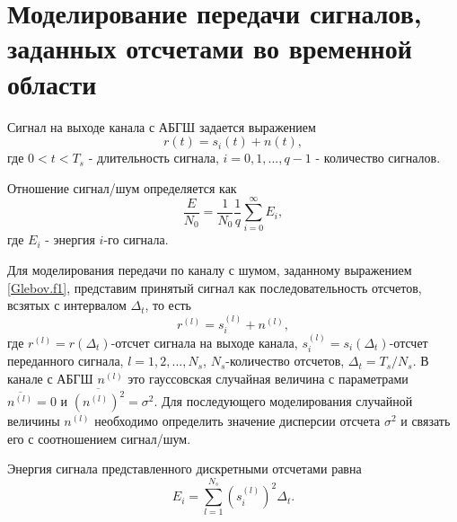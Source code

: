 \section{Моделирование передачи сигналов, заданных отсчетами во временной области}
\label{sec:model}
	Сигнал на выходе канала с АБГШ задается выражением
	\begin{equation}
	\label{Glebov.f1}
		r(t)=s_i(t)+n(t),
	\end{equation}
	где $0<t<T_s$ - длительность сигнала, $i=0,1,...,q-1$ - количество сигналов.

	Отношение сигнал/шум определяется как
	\begin{equation}
	\label{Glebov.f2}
		\frac{E}{N_0}=\frac{1}{N_0}\frac{1}{q}\sum_{i=0}^{\infty}E_i,
	\end{equation}
	где $E_i$ - энергия $i$-го сигнала.
	
	Для моделирования передачи по каналу с шумом, заданному выражением
	\ref{Glebov.f1}, представим принятый сигнал как последовательность отсчетов, всзятых с интервалом $\Delta_t$, то есть
	\begin{equation}
	\label{Glebov.f3}
		r^{(l)}=s_i^{(l)}+n^{(l)},
	\end{equation}
	где $r^{(l)}=r(\Delta_t)$-отсчет сигнала на выходе канала, $s_i^{(l)}=s_i(\Delta_t)$-отсчет переданного сигнала,
	 $l=1,2,...,N_s$, $N_s$-количество отсчетов, $\Delta_t=T_s/N_s$. В канале с АБГШ $n^{(l)}$ это гауссовская 
	 случайная величина с параметрами $\overline{n^{(l)}}=0$ и $\overline{(n^{(l)})^2}=\sigma^2$. 
	 Для последующего моделирования случайной величины $n^{(l)}$ необходимо определить значение дисперсии
	 отсчета $\sigma^2$ и связать его с соотношением сигнал/шум.
	
	Энергия сигнала представленного дискретными отсчетами равна
	\begin{equation}
	\label{Glebov.f4}
		E_i=\sum_{l=1}^{N_s}(s_i^{(l)})^2\Delta_t.
	\end{equation}
	
